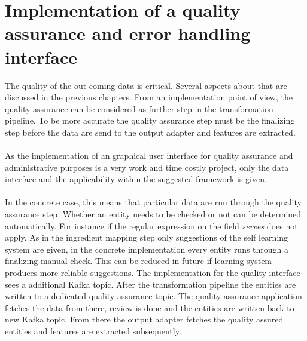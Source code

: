 \section{Implementation of a quality assurance and error handling interface}

The quality of the out coming data is critical. Several aspects about that are discussed in the previous chapters. From an implementation point of view, the quality assurance can be considered as further step in the transformation pipeline. To be more accurate the quality assurance step must be the finalizing step before the data are send to the output adapter and features are extracted.
\\\\
As the implementation of an graphical user interface for quality assurance and administrative purposes is a very work and time costly project, only the data interface and the applicability within the suggested framework is given. 
\\\\
In the concrete case, this means that particular data are run through the quality assurance step. Whether an entity needs to be checked or not can be determined automatically. For instance if the regular expression on the field \textit{serves} does not apply. As in the ingredient mapping step only suggestions of the self learning system are given, in the concrete implementation every entity runs through a finalizing manual check. This can be reduced in future if learning system produces more reliable suggestions. The implementation for the quality interface sees a additional Kafka topic. After the transformation pipeline the entities are written to a dedicated quality assurance topic. The quality assurance application fetches the data from there, review is done and the entities are written back to new Kafka topic. From there the output adapter fetches the quality assured entities and features are extracted subsequently.
